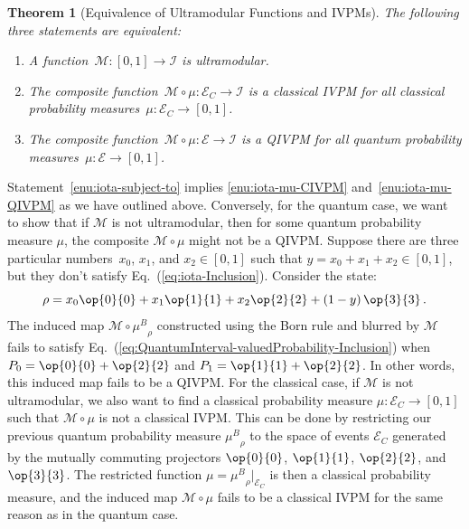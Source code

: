 \documentclass[english,reprint, aps, prl,superscriptaddress, showpacs,
showkeys, longbibliography, amsmath, amssymb, floatfix]{revtex4-1}
\theoremstyle{plain}
\newtheorem{thm}{Theorem}
\theoremstyle{definition}
\newcommand{\events}{\ensuremath{\mathcal{E}}}
\newcommand{\proj}[1]{\op{#1}{#1}}
\newcommand{\ultramodular}{\mathcal{M}}
\newcommand{\muB}{\ensuremath{\mu^{B}}}
\newcommand{\eventsC}{\ensuremath{\events_{C}}}
\begin{document}
\begin{thm}[Equivalence of Ultramodular Functions and IVPMs]\label{thm:iota-statements}The
following three statements are equivalent:
\begin{enumerate}
\item \label{enu:iota-subject-to}A function~$\ultramodular:\left[0,1\right]\rightarrow\mathscr{I}$
is ultramodular.
\item \label{enu:iota-mu-CIVPM}The composite
  function~$\ultramodular\circ\mu:\eventsC\rightarrow\mathscr{I}$
  is a classical IVPM for all classical probability
  measures~$\mu:\eventsC\rightarrow\left[0,1\right]$.
\item \label{enu:iota-mu-QIVPM}The composite
  function~$\ultramodular\circ\mu:\events\rightarrow\mathscr{I}$ is a
  QIVPM for all quantum probability
  measures~$\mu:\events\rightarrow\left[0,1\right]$.
\end{enumerate}
\end{thm}

Statement~\ref{enu:iota-subject-to} implies \ref{enu:iota-mu-CIVPM}
and~\ref{enu:iota-mu-QIVPM} as we have outlined above. Conversely, for the quantum case, we want
to show that if $\ultramodular$ is not ultramodular, then for
some quantum probability measure $\mu$, the composite
$\ultramodular\circ\mu$ might not be a QIVPM. Suppose there are three
particular numbers~$x_{0}$, $x_{1}$, and $x_{2}\in\left[0,1\right]$
such that $y=x_{0}+x_{1}+x_{2}\in\left[0,1\right]$, but they don't
satisfy Eq.~(\ref{eq:iota-Inclusion}). Consider the state:
\[
\rho=x_{0}\proj{0}+x_{1}\proj{1}+x_{2}\proj{2}+\left(1-y\right)\proj{3}\,.
\]
The induced map $\ultramodular\circ\muB_{\rho}$ constructed using the Born rule and
blurred by $\ultramodular$ fails to satisfy
Eq.~(\ref{eq:QuantumInterval-valuedProbability-Inclusion}) when
$P_{0}=\proj{0}+\proj{2}$ and $P_{1}=\proj{1}+\proj{2}$. In other
words, this induced map fails to be a QIVPM. For the classical case, if
$\ultramodular$ is not ultramodular, we also want to find a classical
probability measure $\mu:\eventsC\rightarrow\left[0,1\right]$ such
that $\ultramodular\circ\mu$ is not a classical IVPM. This can be
done by restricting our previous quantum probability measure
$\muB_{\rho}$ to the space of events  $\eventsC$  generated by the
mutually commuting projectors $\proj{0}$, $\proj{1}$, $\proj{2}$, and
$\proj{3}$.  The restricted function
$\mu=\muB_{\rho}|_{\eventsC}$ is then a classical probability
measure, and the induced map $\ultramodular\circ\mu$ fails to be
a classical IVPM for the same reason as in the quantum case.
\end{document}
